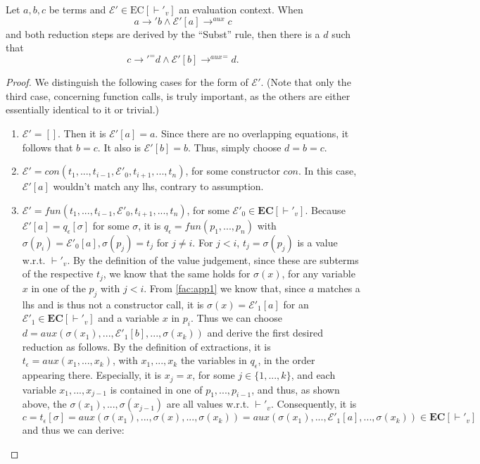 \begin{lemma}
\label{lem:app2}
Let $a, b, c$ be terms and $\mathcal{E}' \in \textrm{EC}[\vdash'_v]$ an evaluation context. When
\[
a \longrightarrow' b \land \mathcal{E}'[a] \longrightarrow^{aux} c
\]
and both reduction steps are derived by the ``Subst'' rule, then there is a $d$ such that
\[
c {\longrightarrow'}^= d \land \mathcal{E}'[b] {\longrightarrow^{aux}}^= d.
\]
\begin{proof}
We distinguish the following cases for the form of $\mathcal{E}'$. (Note that only the third case, concerning function calls, is truly important, as the others are either essentially identical to it or trivial.)

\begin{enumerate}
\item $\mathcal{E}' = []$. Then it is $\mathcal{E}'[a] = a$. Since there are no overlapping equations, it follows that $b = c$. It also is $\mathcal{E}'[b] = b$. Thus, simply choose $d = b = c$.

\item $\mathcal{E}' = con(t_1, ..., t_{i-1}, \mathcal{E}'_0, t_{i+1}, ..., t_n)$, for some constructor $con$. In this case, $\mathcal{E}'[a]$ wouldn't match any lhs, contrary to assumption.

\item $\mathcal{E}' = fun(t_1, ..., t_{i-1}, \mathcal{E}'_0, t_{i+1}, ..., t_n)$, for some $\mathcal{E}'_0 \in \mathbf{EC}[\vdash'_v]$.
Because $\mathcal{E}'[a] = q_\epsilon[\sigma]$ for some $\sigma$, it is $q_\epsilon = fun(p_1, ..., p_n)$ with $\sigma(p_i) = \mathcal{E}'_0[a], \sigma(p_j) = t_j$ for $j \neq i$. For $j < i$, $t_j = \sigma(p_j)$ is a value w.r.t. $\vdash'_v$. By the definition of the value judgement, since these are subterms of the respective $t_j$, we know that the same holds for $\sigma(x)$, for any variable $x$ in one of the $p_j$ with $j < i$. From \autoref{fac:app1} we know that, since $a$ matches a lhs and is thus not a constructor call, it is $\sigma(x) = \mathcal{E}'_1[a]$ for an $\mathcal{E}'_1 \in \mathbf{EC}[\vdash'_v]$ and a variable $x$ in $p_i$. Thus we can choose $d = aux(\sigma(x_1), ..., \mathcal{E}'_1[b], ..., \sigma(x_k))$ and derive the first desired reduction as follows. By the definition of extractions, it is $t_\epsilon = aux(x_1, ..., x_k)$, with $x_1, ..., x_k$ the variables in $q_\epsilon$, in the order appearing there. Especially, it is $x_j = x$, for some $j \in \{1, ..., k\}$, and each variable $x_1, ..., x_{j-1}$ is contained in one of $p_1, ..., p_{i-1}$, and thus, as shown above, the $\sigma(x_1), ..., \sigma(x_{j-1})$ are all values w.r.t. $\vdash'_v$. Consequently, it is $c = t_\epsilon[\sigma] = aux(\sigma(x_1), ..., \sigma(x), ..., \sigma(x_k)) = aux(\sigma(x_1), ..., \mathcal{E}'_1[a], ..., \sigma(x_k)) \in \mathbf{EC}[\vdash'_v]$ and thus we can derive:


\end{enumerate}
\end{proof}
\end{lemma}
